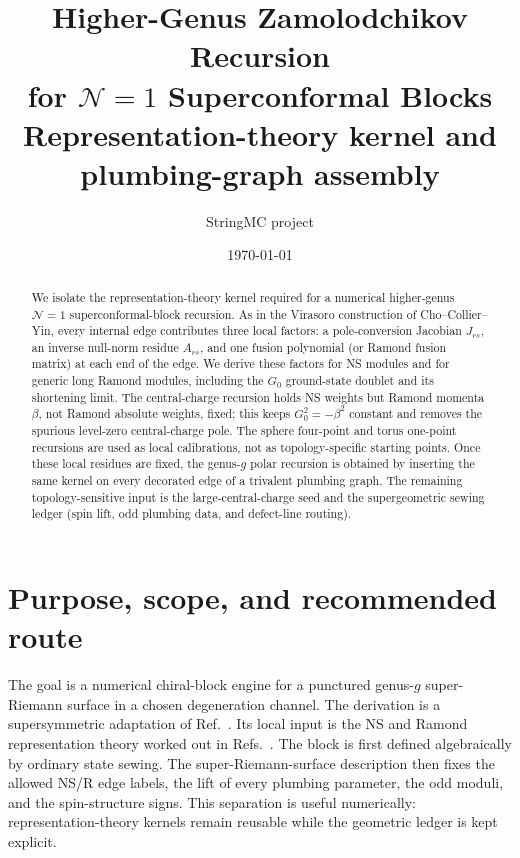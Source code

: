 \documentclass[11pt]{article}
\title{Higher-Genus Zamolodchikov Recursion\\
for $\mathcal N=1$ Superconformal Blocks\\[0.35em]
\large Representation-theory kernel and plumbing-graph assembly}
\author{StringMC project}
\date{\today}
\begin{document}
\maketitle

\begin{abstract}
We isolate the representation-theory kernel required for a numerical
higher-genus $\mathcal N=1$ superconformal-block recursion.  As in the
Virasoro construction of Cho--Collier--Yin, every internal edge contributes
three local factors: a pole-conversion Jacobian $J_{rs}$, an inverse null-norm
residue $A_{rs}$, and one fusion polynomial (or Ramond fusion matrix) at each
end of the edge.  We derive these factors for NS modules and for generic long
Ramond modules, including the $G_0$ ground-state doublet and its shortening
limit.  The central-charge recursion holds NS weights but Ramond momenta
\(\beta\), not Ramond absolute weights, fixed; this keeps
\(G_0^2=-\beta^2\) constant and removes the spurious level-zero
central-charge pole.  The sphere four-point and torus one-point recursions are used as local
calibrations, not as topology-specific starting points.  Once these local
residues are fixed, the genus-$g$ polar recursion is obtained by inserting
the same kernel on every decorated edge of a trivalent plumbing graph.  The
remaining topology-sensitive input is the large-central-charge seed and the
supergeometric sewing ledger (spin lift, odd plumbing data, and defect-line
routing).
\end{abstract}

\tableofcontents

\section{Purpose, scope, and recommended route}

The goal is a numerical chiral-block engine for a punctured genus-$g$
super-Riemann surface in a chosen degeneration channel.  The derivation is a
supersymmetric adaptation of Ref.~\cite{ChoCollierYin2017Recursive}.  Its
local input is the NS and Ramond representation theory worked out in
Refs.~\cite{HadaszJaskolskiSuchanek2007NSBlocks,
HadaszJaskolskiSuchanek2008RamondBlocks,Suchanek2011EllipticRecursion,
HadaszJaskolskiSuchanek2012Toric,BelavinGeiko2018CRecursion}.
The block is first defined algebraically by ordinary state sewing.  The
super-Riemann-surface description then fixes the allowed NS/R edge labels,
the lift of every plumbing parameter, the odd moduli, and the spin-structure
signs.  This separation is useful numerically: representation-theory kernels
remain reusable while the geometric ledger is kept explicit.
\end{document}
